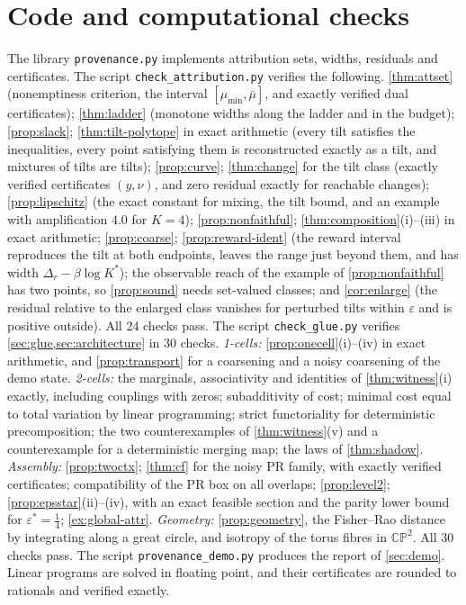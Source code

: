 \documentclass[11pt]{article}
\theoremstyle{definition}
\theoremstyle{remark}
\begin{document}
\appendix

\section{Code and computational checks}\label{sec:code}

The library \texttt{provenance.py} implements attribution sets, widths, residuals and certificates.
The script \texttt{check\allowbreak\_attribution.py} verifies the following.
\cref{thm:attset} (nonemptiness criterion, the interval $[\mu_{\min},\bar\mu]$, and exactly verified dual
certificates); \cref{thm:ladder} (monotone widths along the ladder and in the budget);
\cref{prop:slack}; \cref{thm:tilt-polytope} in exact arithmetic (every tilt satisfies the inequalities,
every point satisfying them is reconstructed exactly as a tilt, and mixtures of tilts are tilts);
\cref{prop:curve}; \cref{thm:change} for the tilt class (exactly verified certificates $(y,\nu)$, and
zero residual exactly for reachable changes); \cref{prop:lipschitz} (the exact constant for mixing, the
tilt bound, and an example with amplification $4.0$ for $K=4$); \cref{prop:nonfaithful};
\cref{thm:composition}(i)--(iii) in exact arithmetic; \cref{prop:coarse}; \cref{prop:reward-ident} (the
reward interval reproduces the tilt at both endpoints, leaves the range just beyond them, and has
width $\Delta_r-\beta\log K^*$); the observable reach of the example of \cref{prop:nonfaithful} has two
points, so \cref{prop:sound} needs set-valued classes; and \cref{cor:enlarge} (the residual relative
to the enlarged class vanishes for perturbed tilts within $\varepsilon$ and is positive outside). All 24
checks pass.
The script \texttt{check\allowbreak\_glue.py} verifies \cref{sec:glue,sec:architecture} in 30 checks.
\emph{1-cells:} \cref{prop:onecell}(i)--(iv) in exact arithmetic, and \cref{prop:transport} for a
coarsening and a noisy coarsening of the demo state. \emph{2-cells:} the marginals, associativity and
identities of \cref{thm:witness}(i) exactly, including couplings with zeros; subadditivity of cost; minimal
cost equal to total variation by linear programming; strict functoriality for deterministic
precomposition; the two counterexamples of \cref{thm:witness}(v) and a counterexample for a deterministic
merging map; the laws of \cref{thm:shadow}. \emph{Assembly:} \cref{prop:twoctx}; \cref{thm:cf} for the
noisy PR family, with exactly verified certificates; compatibility of the PR box on all overlaps;
\cref{prop:level2}; \cref{prop:epsstar}(ii)--(iv), with an exact feasible section and the parity lower
bound for $\varepsilon^*=\tfrac14$; \cref{ex:global-attr}. \emph{Geometry:} \cref{prop:geometry}, the
Fisher--Rao distance by integrating along a great circle, and isotropy of the torus fibres in
$\mathbb{CP}^2$. All 30 checks pass.
The script \texttt{provenance\allowbreak\_demo.py} produces the report of \cref{sec:demo}. Linear programs are solved in
floating point, and their certificates are rounded to rationals and verified exactly.
\end{document}
